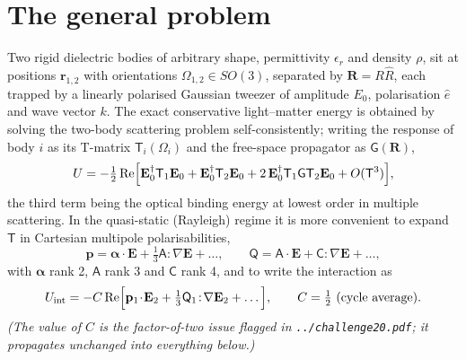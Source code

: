 \documentclass[11pt,a4paper]{article}
\newcommand{\bal}{\boldsymbol{\alpha}}
\newcommand{\Gsf}{\mathsf{G}}
\begin{document}
\section{The general problem}

Two rigid dielectric bodies of arbitrary shape, permittivity $\epsilon_r$ and
density $\rho$, sit at positions $\mathbf r_{1,2}$ with orientations
$\Omega_{1,2}\in SO(3)$, separated by $\mathbf R=R\hat R$, each trapped by a
linearly polarised Gaussian tweezer of amplitude $E_0$, polarisation $\hat e$
and wave vector $k$.  The exact conservative light--matter energy is obtained by
solving the two-body scattering problem self-consistently; writing the response
of body $i$ as its T-matrix $\mathsf T_i(\Omega_i)$ and the free-space
propagator as $\Gsf(\mathbf R)$,
\begin{equation}
  U=-\tfrac12\operatorname{Re}\Bigl[\mathbf E_0^{\dagger}\mathsf T_1\mathbf E_0
   +\mathbf E_0^{\dagger}\mathsf T_2\mathbf E_0
   +2\,\mathbf E_0^{\dagger}\mathsf T_1\Gsf\mathsf T_2\mathbf E_0
   +O(\mathsf T^{3})\Bigr],
  \label{eq:Tmatrix}
\end{equation}
the third term being the optical binding energy at lowest order in multiple
scattering.  In the quasi-static (Rayleigh) regime it is more convenient to
expand $\mathsf T$ in Cartesian multipole polarisabilities,
\begin{equation}
  \mathbf p=\bal\cdot\mathbf E+\tfrac13\mathsf A\!:\!\nabla\mathbf E+\dots,
  \qquad
  \mathsf Q=\mathsf A\cdot\mathbf E+\mathsf C\!:\!\nabla\mathbf E+\dots,
  \label{eq:multipoles}
\end{equation}
with $\bal$ rank 2, $\mathsf A$ rank 3 and $\mathsf C$ rank 4, and to write the
interaction as
\begin{equation}
  U_{\rm int}=-C\operatorname{Re}\Bigl[\mathbf p_1\!\cdot\!\mathbf E_2
  +\tfrac13\mathsf Q_1\!:\!\nabla\mathbf E_2+\dots\Bigr],
  \qquad C=\tfrac12\ \text{(cycle average).}
  \label{eq:Uexpand}
\end{equation}
\emph{(The value of $C$ is the factor-of-two issue flagged in
\texttt{../challenge20.pdf}; it propagates unchanged into everything below.)}
\end{document}
